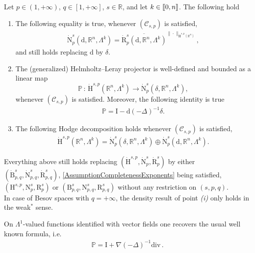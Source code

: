 \documentclass[AHL,Unicode,longabstracts,published]{cedram}
\renewcommand*{\div}{\mathrm{div\,}}
\newcommand{\bbP}{\mathbb{P}}
\newcommand{\bbR}{\mathbb{R}}
\newcommand{\rmH}{\mathrm{H}}%
\newcommand{\rmB}{\mathrm{B}}
\newcommand{\rmd}{\mathrm{d}}
\newcommand{\rmR}{\mathrm{R}}
\newcommand{\rmN}{\mathrm{N}}
\newcommand{\rmI}{\mathrm{I}}
\newcommand{\clC}{\mathcal{C}}
\newcommand{\llbracket}{\mathopen{[\mkern -2.7mu[}}
\newcommand{\rrbracket}{\mathclose{]\mkern -2.7mu]}}
\newcommand{\llb}{\llbracket}
\newcommand{\rrb}{\rrbracket}
\newcommand*{\romanenumi}{\renewcommand*{\theenumi}{\roman{enumi}}}
\begin{document}
\begin{theo}\label{thm:HodgeDecompRn}
Let $p\in(1,+\infty)$, $q\in[1,+\infty]$, $s\in\bbR$, and let $k\in\llb 0,n\rrb$. The following hold
\begin{enumerate}\romanenumi
\item\label{theo2.9.1} The following equality is true, whenever $(\clC_{s,p})$ is satisfied,
\begin{align*}
\dot{\rmN}^{s}_{p}\left(\rmd,\bbR^n,\Lambda^k\right) = \overline{\dot{\rmR}^{s}_{p}\left(\rmd,\bbR^n,\Lambda^k\right)}^{\|\cdot\|_{\dot{\rmH}^{s,p}(\bbR^n)}},
\end{align*}
and still holds replacing $\rmd$ by $\delta$.

\item The (generalized) Helmholtz--Leray projector is well-defined and bounded as a linear map
\[
\bbP\,:\, \dot{\rmH}^{s,p}\left(\bbR^n,\Lambda^k\right)\longrightarrow \dot{\rmN}^{s}_{p}\left(\delta,\bbR^n,\Lambda^k\right),
\]
whenever $(\clC_{s,p})$ is satisfied. Moreover, the following identity is true
\begin{align*}
\bbP = \rmI  - \rmd(-\Delta)^{-1}\delta .
\end{align*}

\item The following Hodge decomposition holds whenever $(\clC_{s,p})$ is satisfied,
\begin{align*}
\dot{\rmH}^{s,p}\left(\bbR^n,\Lambda^k\right) = \dot{\rmN}^{s}_{p}\left(\delta,\bbR^n,\Lambda^k\right) \oplus \dot{\rmN}^{s}_{p}\left(\rmd,\bbR^n,\Lambda^k\right).
\end{align*}
\end{enumerate}
Everything above still holds replacing
$(\dot{\rmH}^{s,p},\dot{\rmN}^{s}_{p},\dot{\rmR}^{s}_{p})$ by either $(\dot{\rmB}^{s}_{p,q},\dot{\rmN}^{s}_{p,q},\dot{\rmR}^{s}_{p,q})$, \eqref{AssumptionCompletenessExponents} being satisfied, $({\rmH}^{s,p},{\rmN}^{s}_{p},{\rmR}^{s}_{p})$ or $({\rmB}^{s}_{p,q},{\rmN}^{s}_{p,q},{\rmR}^{s}_{p,q})$ without any restriction on $(s,p,q)$.\\
In case of Besov spaces with $q=+\infty$, the density result of point \emph{(i)} only holds in the weak${}^\ast$ sense.
\end{theo}


\begin{rema}
On $\Lambda^1$-valued functions identified with vector fields one recovers the usual well known formula, i.e.
\begin{align*}
\bbP=\rmI + \nabla (-\Delta)^{-1}\div .
\end{align*}
\end{rema}
\end{document}
